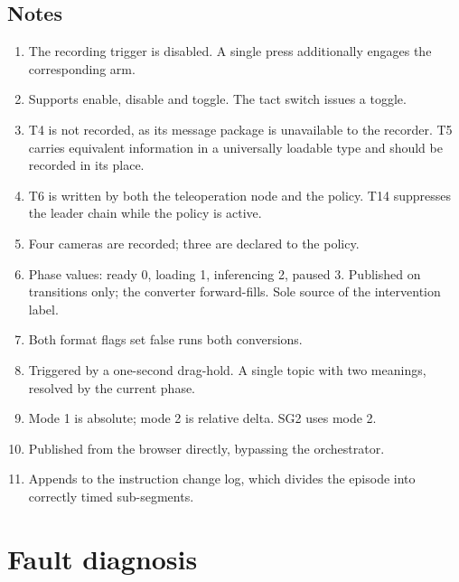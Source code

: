 \documentclass[11pt,a4paper]{article}
\begin{document}
\subsection{Notes}
\label{sec:legendnotes}

\begin{enumerate}[leftmargin=8mm]


\item The recording trigger is disabled. A single press additionally engages the
      corresponding arm.
\item Supports enable, disable and toggle. The tact switch issues a toggle.
\item T4 is not recorded, as its message package is unavailable to the recorder.
      T5 carries equivalent information in a universally loadable type and
      should be recorded in its place.
\item T6 is written by both the teleoperation node and the policy. T14
      suppresses the leader chain while the policy is active.
\item Four cameras are recorded; three are declared to the policy.
\item Phase values: ready 0, loading 1, inferencing 2, paused 3. Published on
      transitions only; the converter forward-fills. Sole source of the
      intervention label.
\item Both format flags set false runs both conversions.
\item Triggered by a one-second drag-hold. A single topic with two meanings,
      resolved by the current phase.
\item Mode 1 is absolute; mode 2 is relative delta. SG2 uses mode 2.
\item Published from the browser directly, bypassing the orchestrator.
\item Appends to the instruction change log, which divides the episode into
      correctly timed sub-segments.
\end{enumerate}

\newpage
\section{Fault diagnosis}
\end{document}
